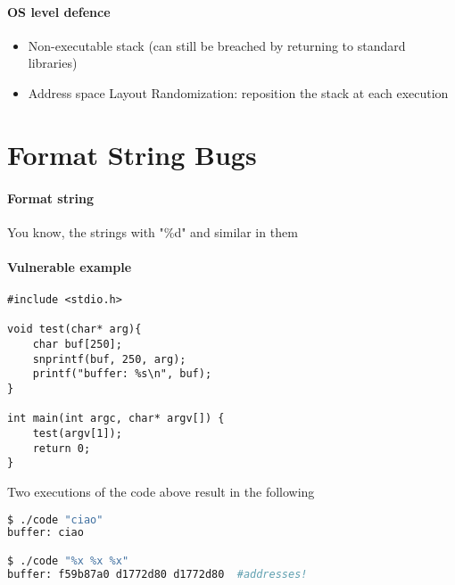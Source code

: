 \documentclass{article}
\begin{document}
\paragraph{OS level defence}
\begin{itemize}
\item Non-executable stack (can still be breached by returning to standard libraries)
\item Address space Layout Randomization: reposition the stack at each execution
\end{itemize}


\section{Format String Bugs}
\paragraph{Format string} You know, the strings with "\%d" and similar in them
\paragraph{Vulnerable example}
\begin{lstlisting}[style=CStyle]
#include <stdio.h>

void test(char* arg){
    char buf[250];
    snprintf(buf, 250, arg);
    printf("buffer: %s\n", buf);
}

int main(int argc, char* argv[]) {
    test(argv[1]);
    return 0;
}
\end{lstlisting}
Two executions of the code above result in the following
\begin{lstlisting}[language=bash]
$ ./code "ciao"
buffer: ciao

$ ./code "%x %x %x"
buffer: f59b87a0 d1772d80 d1772d80	#addresses!
\end{lstlisting}
\end{document}
